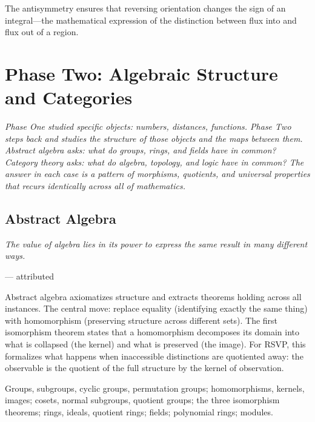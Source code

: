 \documentclass[12pt, twoside, openright, a4paper]{book}
\newcommand{\sidenote}[1]{\marginnote{#1}}
\newcommand{\chapterepigraph}[2]{%
  \vspace{-8pt}\begin{center}\begin{minipage}{0.78\textwidth}
  \small\itshape #1\begin{flushright}--- #2\end{flushright}
  \end{minipage}\end{center}\vspace{10pt}}
\newcommand{\partintro}[1]{%
  \begin{tcolorbox}[enhanced, colback=RSVPdeep, colframe=RSVPdeep, coltext=white,
    arc=6pt, boxrule=0pt, left=8mm, right=8mm, top=6mm, bottom=6mm]
  \large\itshape #1\end{tcolorbox}}
\begin{document}
The antisymmetry ensures that reversing orientation changes the sign of an integral---the mathematical expression of the distinction between flux into and flux out of a region.

\part{Phase Two: Algebraic Structure and Categories}

\partintro{Phase One studied specific objects: numbers, distances, functions.
Phase Two steps back and studies the \emph{structure} of those objects and the
maps between them. Abstract algebra asks: what do groups, rings, and fields have
in common? Category theory asks: what do algebra, topology, and logic have in
common? The answer in each case is a pattern of morphisms, quotients, and
universal properties that recurs identically across all of mathematics.}

\chapter{Abstract Algebra}
\chapterepigraph{The value of algebra lies in its power to express the same result in many different ways.}{attributed}
\sidenote{Recommended:\\Artin, \textit{Algebra};\\Dummit--Foote}
\label{ch:algebra}

\begin{motivation}
Abstract algebra axiomatizes structure and extracts theorems holding across all instances.
The central move: replace equality (identifying exactly the same thing) with homomorphism (preserving structure across different sets).
The first isomorphism theorem states that a homomorphism decomposes its domain into what is collapsed (the kernel) and what is preserved (the image).
For RSVP, this formalizes what happens when inaccessible distinctions are quotiented away: the observable is the quotient of the full structure by the kernel of observation.
\end{motivation}

\begin{structures}
Groups, subgroups, cyclic groups, permutation groups; homomorphisms, kernels, images; cosets, normal subgroups, quotient groups; the three isomorphism theorems; rings, ideals, quotient rings; fields; polynomial rings; modules.
\end{structures}
\end{document}
